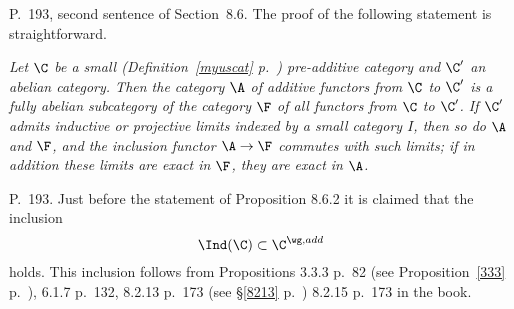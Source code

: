 \documentclass[12pt]{article}
\theoremstyle{remark}
\theoremstyle{definition}
\begin{document}
%


\begin{s} 
P.~193, second sentence of Section~8.6. The proof of the following statement is straightforward. 

\nn\emph{Let $\C$ be a small (Definition~\ref{myuscat} p.~) pre-additive category and $\C'$ an abelian category. Then the category $\A$ of additive functors from $\C$ to $\C'$ is a fully abelian subcategory of the category $\F$ of all functors from $\C$ to $\C'$. If $\C'$ admits inductive or projective limits indexed by a small category $I$, then so do $\A$ and $\F$, and the inclusion functor $\A\to\F$ commutes with such limits; if in addition these limits are exact in $\F$, they are exact in $\A$.}
\end{s}

%

\begin{s}
P.~193. Just before the statement of Proposition 8.6.2 it is claimed that the inclusion 
$$
\Ind(\C)\subset\C^{\wg,add}
$$ 
holds. This inclusion follows from Propositions 3.3.3 p.~82 (see Proposition~\ref{333} p.~), 6.1.7 p.~132, 8.2.13 p.~173 (see \S\ref{8213} p.~) 8.2.15 p.~173 in the book.
\end{s}

%

\end{document}
